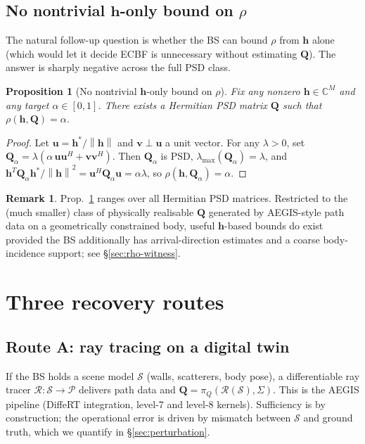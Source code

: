 \documentclass[11pt,a4paper]{article}
\newtheorem{proposition}[theorem]{Proposition}
\theoremstyle{definition}
\newtheorem{remark}[theorem]{Remark}
\newcommand{\hh}{\mathbf{h}}
\newcommand{\Q}{\mathbf{Q}}
\newcommand{\Sigmaset}{\Sigma}
\newcommand{\C}{\mathbb{C}}
\newcommand{\lammax}{\lambda_{\max}}
\newcommand{\norm}[1]{\left\lVert #1 \right\rVert}
\begin{document}
\subsection{No nontrivial \texorpdfstring{$\hh$}{h}-only bound on \texorpdfstring{$\rho$}{rho}}

The natural follow-up question is whether the BS can bound $\rho$
from $\hh$ alone (which would let it decide ECBF is unnecessary
without estimating $\Q$). The answer is sharply negative across the
full PSD class.

\begin{proposition}[No nontrivial $\hh$-only bound on $\rho$]
\label{prop:no-rho-bound}
Fix any nonzero $\hh\in\C^M$ and any target $\alpha\in[0,1]$. There
exists a Hermitian PSD matrix $\Q$ such that $\rho(\hh,\Q)=\alpha$.
\end{proposition}

\begin{proof}
Let $\mathbf{u}=\hh^*/\norm{\hh}$ and $\mathbf{v}\perp\mathbf{u}$ a unit
vector. For any $\lambda>0$, set
$\Q_\alpha = \lambda(\alpha\,\mathbf{u}\mathbf{u}^H+\mathbf{v}\mathbf{v}^H)$.
Then $\Q_\alpha$ is PSD, $\lammax(\Q_\alpha)=\lambda$, and
$\hh^T\Q_\alpha\hh^*/\norm{\hh}^2 = \mathbf{u}^H\Q_\alpha\mathbf{u}=\alpha\lambda$,
so $\rho(\hh,\Q_\alpha)=\alpha$.
\end{proof}

\begin{remark}
\label{rem:scope}
Prop.~\ref{prop:no-rho-bound} ranges over all Hermitian PSD matrices.
Restricted to the (much smaller) class of physically realisable $\Q$
generated by AEGIS-style path data on a geometrically constrained body,
useful $\hh$-based bounds do exist provided the BS additionally has
arrival-direction estimates and a coarse body-incidence support;
see \S\ref{sec:rho-witness}.
\end{remark}

\section{Three recovery routes}
\label{sec:routes}

\subsection{Route A: ray tracing on a digital twin}

If the BS holds a scene model $\mathcal{S}$ (walls, scatterers, body
pose), a differentiable ray tracer $\mathcal{R}:\mathcal{S}\to\mathcal{P}$
delivers path data and $\Q=\pi_Q(\mathcal{R}(\mathcal{S}),\Sigmaset)$.
This is the AEGIS pipeline (DiffeRT integration, level-7 and
level-8 kernels). Sufficiency is by construction; the operational error
is driven by mismatch between $\mathcal{S}$ and ground truth, which we
quantify in \S\ref{sec:perturbation}.
\end{document}
